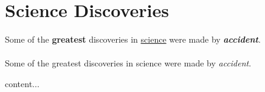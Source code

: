\documentclass{article}
\begin{document}
	
	\section{Science Discoveries}
	Some of the \textbf{greatest}
	discoveries in \underline{science}
	were made by
	\textbf{\textit{accident}}.
	
	\paragraph{}
	Some of the greatest discoveries in science were made by \emph{accident}.

	content...
\end{document}
